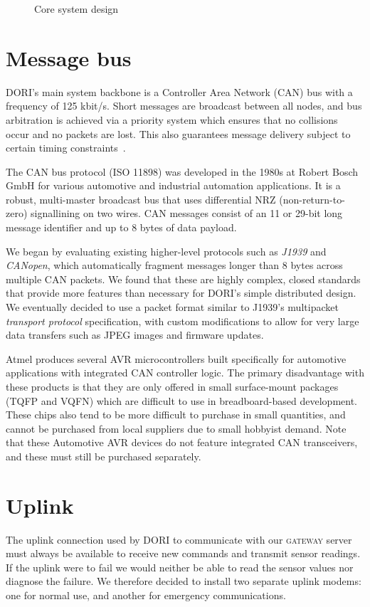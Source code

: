 \begin{figure}[h]
    \centering
    
    \caption{Core system design}
\end{figure}

    \section{Message bus}
    DORI's main system backbone is a Controller Area Network (CAN) bus with a frequency of 125 kbit/s. Short messages are broadcast between all nodes, and bus arbitration is achieved via a priority system which ensures that no collisions occur and no packets are lost. This also guarantees message delivery subject to certain timing constraints~\cite{cantimes}.

    The CAN bus protocol (ISO 11898) was developed in the 1980s at Robert Bosch GmbH for various automotive and industrial automation applications. It is a robust, multi-master broadcast bus that uses differential NRZ (non-return-to-zero) signallining on two wires. CAN messages consist of an 11 or 29-bit long message identifier and up to 8 bytes of data payload. 

    We began by evaluating existing higher-level protocols such as \emph{J1939} and \emph{CANopen}, which automatically fragment messages longer than 8 bytes across multiple CAN packets. We found that these are highly complex, closed standards that provide more features than necessary for DORI's simple distributed design. We eventually decided to use a packet format similar to J1939's multipacket \emph{transport protocol} specification, with custom modifications to allow for very large data transfers such as JPEG images and firmware updates.

    Atmel produces several AVR microcontrollers built specifically for automotive applications with integrated CAN controller logic. The primary disadvantage with these products is that they are only offered in small surface-mount packages (TQFP and VQFN) which are difficult to use in breadboard-based development. These chips also tend to be more difficult to purchase in small quantities, and cannot be purchased from local suppliers due to small hobbyist demand. Note that these Automotive AVR devices do not feature integrated CAN transceivers, and these must still be purchased separately.

    \section{Uplink}
    The uplink connection used by DORI to communicate with our \textsc{gateway} server must always be available to receive new commands and transmit sensor readings. If the uplink were to fail we would neither be able to read the sensor values nor diagnose the failure. We therefore decided to install two separate uplink modems: one for normal use, and another for emergency communications.


